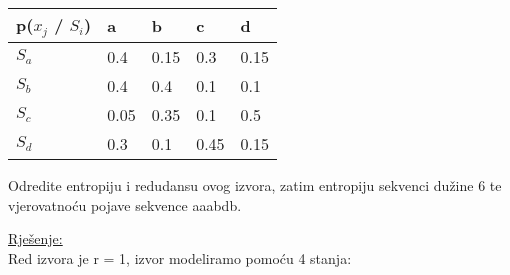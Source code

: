 \documentclass[12pt]{article}
\begin{document}
\begin{table}[hp]
\centering
\begin{tabular}{|l|l|l|l|l|}
\hline
p($x_j$ / $S_i$) & a    & b    & c    & d    \\ \hline
$S_a$           & 0.4  & 0.15 & 0.3  & 0.15 \\ \hline
$S_b$           & 0.4  & 0.4  & 0.1  & 0.1  \\ \hline
$S_c$           & 0.05 & 0.35 & 0.1  & 0.5  \\ \hline
$S_d$           & 0.3  & 0.1  & 0.45 & 0.15 \\ \hline
\end{tabular}
\end{table}

Odredite entropiju i redudansu ovog izvora, zatim entropiju sekvenci dužine 6 te vjerovatnoću pojave sekvence aaabdb.

\underline{Rješenje:}\\

Red izvora je r = 1, izvor modeliramo pomoću 4 stanja:
\end{document}

